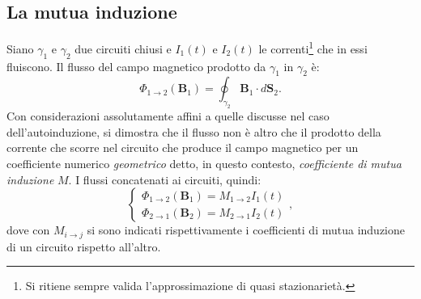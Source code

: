 \documentclass[a4paper,11pt]{report}
\begin{document}
\subsection{La mutua induzione}
Siano $\gamma_1$ e $\gamma_2$ due circuiti chiusi e $I_1(t)$ e $I_2(t)$ le correnti\footnote{Si ritiene sempre valida l'approssimazione di quasi stazionarietà.} che in essi fluiscono. Il flusso del campo magnetico prodotto da $\gamma_1$ in $\gamma_2$ è:
\begin{equation}
\Phi_{1\rightarrow 2}(\bm{B}_1) = \oint_{\gamma_2} \bm{B}_1 \cdot d\bm{S}_2.
\end{equation}
Con considerazioni assolutamente affini a quelle discusse nel caso dell'autoinduzione, si dimostra che il flusso non è altro che il prodotto della corrente che scorre nel circuito che produce il campo magnetico per un coefficiente numerico \textit{geometrico} detto, in questo contesto, \textit{coefficiente di mutua induzione} $M$. I flussi concatenati ai circuiti, quindi:
\begin{equation}
\begin{cases}
\Phi_{1\rightarrow 2}(\bm{B}_1) = M_{1\rightarrow 2}I_1(t) \\
\Phi_{2\rightarrow 1}(\bm{B}_2) = M_{2\rightarrow 1}I_2(t)
\end{cases}
,
\end{equation}
dove con $M_{i\rightarrow j}$ si sono indicati rispettivamente i coefficienti di mutua induzione di un circuito rispetto all'altro.
\end{document}
